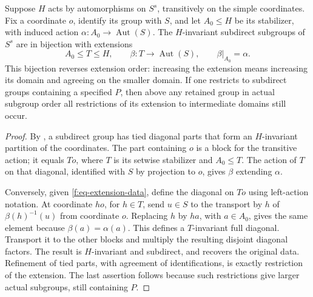 \begin{lemma}\label{f:lem-extension-description}
Suppose $H$ acts by automorphisms on $S^s$, transitively on the simple
coordinates. Fix a coordinate $o$, identify its group with $S$, and let
$A_0\le H$ be its stabilizer, with induced action
$\alpha:A_0\to\operatorname{Aut}(S)$. The $H$-invariant subdirect subgroups
of $S^s$ are in bijection with extensions
\begin{equation}\label{f:eq-extension-data}
 A_0\le T\le H,\qquad
 \beta:T\longrightarrow\operatorname{Aut}(S),\qquad
 \beta|_{A_0}=\alpha.
\end{equation}
This bijection reverses extension order: increasing the extension means
increasing its domain and agreeing on the smaller domain. If one restricts
to subdirect groups containing a specified $P$, then above any retained
group in actual subgroup order all restrictions of its extension to
intermediate domains still occur.
\end{lemma}
\begin{proof}
By , a subdirect group has tied diagonal parts that
form an $H$-invariant partition of the coordinates. The part containing $o$
is a block for the transitive action; it equals $To$, where $T$ is its
setwise stabilizer and $A_0\le T$. The action of $T$ on that diagonal,
identified with $S$ by projection to $o$, gives $\beta$ extending $\alpha$.

Conversely, given \eqref{f:eq-extension-data}, define the diagonal on $To$
using left-action notation. At coordinate $ho$, for $h\in T$, send $u\in S$
to the transport by $h$ of $\beta(h)^{-1}(u)$ from coordinate $o$. Replacing
$h$ by $ha$, with $a\in A_0$, gives the same element because
$\beta(a)=\alpha(a)$. This defines a $T$-invariant full diagonal. Transport
it to the other blocks and multiply the resulting disjoint diagonal
factors. The result is $H$-invariant and subdirect, and recovers the original
data. Refinement of tied parts, with agreement of identifications, is
exactly restriction of the extension. The last assertion follows because
such restrictions give larger actual subgroups, still containing $P$.
\end{proof}

